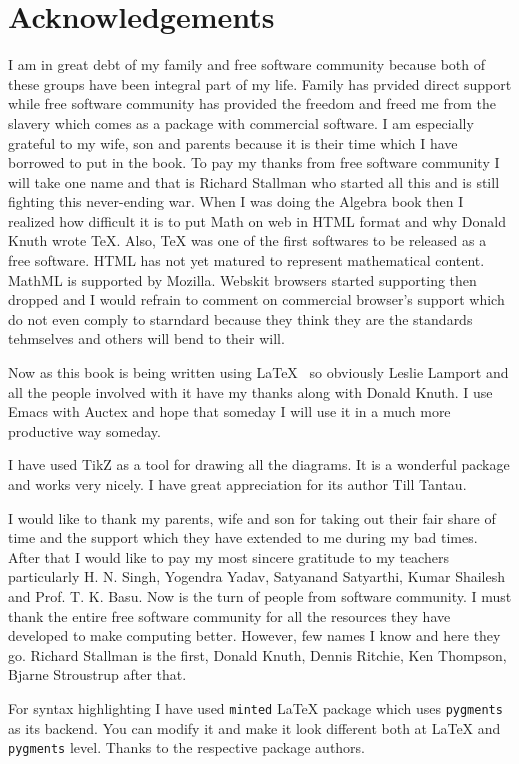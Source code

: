 \section*{Acknowledgements}
I am in great debt of my family and free software community because both of
these groups have been integral part of my life. Family has prvided direct
support while free software community has provided the freedom and freed me
from the slavery which comes as a package with commercial software. I am
especially grateful to my wife, son and parents because it is their time which
I have borrowed to put in the book. To pay my thanks from free software
community  I will take one name and that is Richard Stallman who started all
this  and is still fighting this never-ending war. When I was doing the Algebra
book then I realized how difficult it is to put Math on web in HTML format and
why Donald Knuth wrote \TeX{}. Also, \TeX{} was one of the first softwares to
be released as a free software. HTML has not yet matured to represent
mathematical content. MathML is supported by Mozilla. Webskit browsers started
supporting  then dropped and I would refrain to comment on commercial browser's
support which do not even comply to starndard because they think they are the
standards tehmselves and others will bend to their will. 

Now as this book is being written using \LaTeX{}~ so obviously Leslie Lamport
and all the people involved with it have my thanks along with Donald Knuth. I
use Emacs with Auctex and hope that someday I will use it in a much more
productive way someday.

I have used TikZ as a tool for drawing all the diagrams. It is a wonderful
package and works very nicely. I have great appreciation for its author Till
Tantau.

I would like to thank my parents, wife and son for taking out their fair share
of time and the support which they have extended to me during my bad
times. After that I would like to pay my most sincere gratitude to my teachers
particularly H. N. Singh, Yogendra Yadav, Satyanand Satyarthi, Kumar Shailesh
and Prof. T. K. Basu. Now is the turn of people from software community. I must
thank the entire free software community for all the resources they have
developed to make computing better. However, few names I know and here they
go. Richard Stallman is the first, Donald Knuth, Dennis Ritchie, Ken Thompson,
Bjarne Stroustrup after that.

For syntax highlighting I have used \texttt{minted} \LaTeX{} package which
uses \texttt{pygments} as its backend. You can modify it and make it look
different both at \LaTeX{} and \texttt{pygments} level. Thanks to the
respective package authors.

